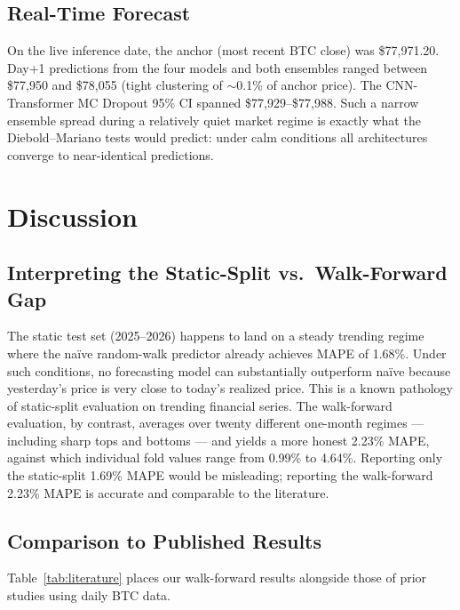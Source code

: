 \documentclass[12pt]{article}
\begin{document}
\subsection{Real-Time Forecast}

On the live inference date, the anchor (most recent BTC close) was \$77{,}971.20. Day+1 predictions from the four models and both ensembles ranged between \$77{,}950 and \$78{,}055 (tight clustering of $\sim$0.1\% of anchor price). The CNN-Transformer MC Dropout 95\% CI spanned \$77{,}929--\$77{,}988. Such a narrow ensemble spread during a relatively quiet market regime is exactly what the Diebold--Mariano tests would predict: under calm conditions all architectures converge to near-identical predictions.

\section{Discussion}

\subsection{Interpreting the Static-Split vs.\ Walk-Forward Gap}

The static test set (2025--2026) happens to land on a steady trending regime where the na\"ive random-walk predictor already achieves MAPE of 1.68\%. Under such conditions, no forecasting model can substantially outperform na\"ive because yesterday's price is very close to today's realized price. This is a known pathology of static-split evaluation on trending financial series. The walk-forward evaluation, by contrast, averages over twenty different one-month regimes --- including sharp tops and bottoms --- and yields a more honest 2.23\% MAPE, against which individual fold values range from 0.99\% to 4.64\%. Reporting only the static-split 1.69\% MAPE would be misleading; reporting the walk-forward 2.23\% MAPE is accurate and comparable to the literature.

\subsection{Comparison to Published Results}

Table~\ref{tab:literature} places our walk-forward results alongside those of prior studies using daily BTC data.
\end{document}
